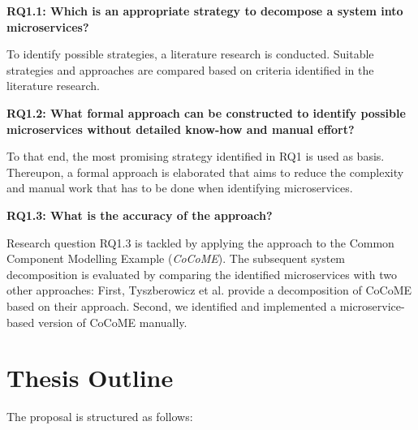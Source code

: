 \vspace{0.5cm}
\noindent
\textbf{RQ1.1: Which is an appropriate strategy to decompose a system into microservices?}

\vspace{0.5cm}
\noindent
To identify possible strategies, a literature research is conducted. Suitable strategies and approaches are compared based on criteria identified in the literature research.
\vspace{0.5cm}

\noindent
\textbf{RQ1.2: What formal approach can be constructed to identify possible microservices without detailed know-how and manual effort?}

\vspace{0.5cm}
\noindent
To that end, the most promising strategy identified in RQ1 is used as basis. Thereupon, a formal approach is elaborated that aims to reduce the complexity and manual work that has to be done when identifying microservices.
\vspace{0.5cm}


\noindent
\textbf{RQ1.3: What is the accuracy of the approach?   }

\vspace{0.5cm}
\noindent
Research question RQ1.3 is tackled by applying the approach to the Common Component Modelling Example (\textit{CoCoME}). The subsequent system decomposition is evaluated by comparing the identified microservices with two other approaches: First, Tyszberowicz et al. \cite{FunctionalDecompositionHeinrich} provide a decomposition of CoCoME based on their approach. Second, we identified and implemented a microservice-based version of CoCoME manually. 

\vspace{0.5cm}



\endgroup
\vspace{1cm}







\section{Thesis Outline}
\label{sec_Introduction:ThesisOutline}
The proposal is structured as follows:

